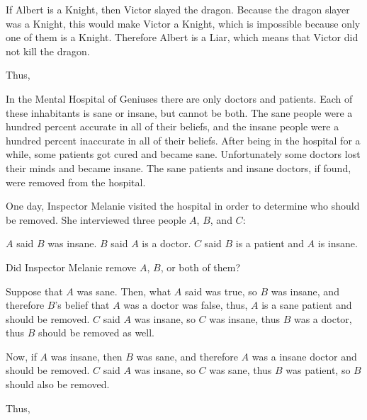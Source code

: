 \documentclass{article}
\begin{document}
\begin{soln} 
    If Albert is a Knight, then Victor slayed the dragon.
    Because the dragon slayer was a Knight, this would make Victor a Knight,
    which is impossible because only one of them is a Knight.
    Therefore Albert is a Liar, which means that Victor did not kill the dragon.
    
    Thus, 
\end{soln}

\begin{example*}
    \label{example:pi-2022-4-p11}
    In the Mental Hospital of Geniuses there are only doctors and patients.
    Each of these inhabitants is sane or insane, but cannot be both.
    The sane people were a hundred percent accurate in all of their beliefs, 
    and the insane people were a hundred percent inaccurate in all of their beliefs.
    After being in the hospital for a while, some patients got cured and became sane.
    Unfortunately some doctors lost their minds and became insane.
    The sane patients and insane doctors, if found, were removed from the hospital.
    
    One day, Inspector Melanie visited the hospital in order to determine who should be removed.
    She interviewed three people $A$, $B$, and $C$:
    \begin{itemize}[topsep=0pt, partopsep=0pt, itemsep=0pt]
        \ii $A$ said $B$ was insane.
        \ii $B$ said $A$ is a doctor.
        \ii $C$ said $B$ is a patient and $A$ is insane.
    \end{itemize}

    Did Inspector Melanie remove $A$, $B$, or both of them?
\end{example*}

\begin{soln} 
    Suppose that $A$ was sane. Then, what $A$ said was true, so $B$ was insane, and therefore $B$'s belief that $A$ was a doctor
    was false, thus, $A$ is a sane patient and should be removed.
    $C$ said $A$ was insane, so $C$ was insane, thus $B$ was a doctor, thus $B$ should be removed as well.
    
    Now, if $A$ was insane, then $B$ was sane, and therefore $A$ was a insane doctor and should be removed.
    $C$ said $A$ was insane, so $C$ was sane, thus $B$ was patient, so $B$ should also be removed.
    
    Thus, 
\end{soln}
\end{document}
